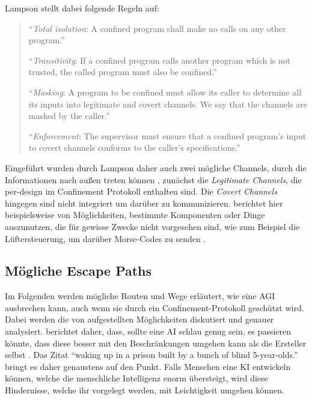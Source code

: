         Lampson stellt dabei folgende Regeln auf:
        \begin{quote}
            ``\textit{Total isolation}: A confined program shall make no calls on any other program.''

            ``\textit{Transitivity}: If a confined program calls another program which is not trusted, the
            called program must also be confined.''

            ``\textit{Masking}: A program to be confined must allow its caller to determine all its inputs into
            legitimate and covert channels. We say that the channels are masked by the caller.''

            ``\textit{Enforcement}: The supervisor must ensure that a confined program's input to covert
            channels conforms to the caller's specifications.''
        \end{quote}
        \cite{lampson1973note}
        Eingeführt wurden durch Lampson daher auch zwei mögliche Channels, durch die Informationen nach außen treten
        können \cite{yampolskiy2012leakproofing}, zunächst die \textit{Legitimate Channels}, die per-design im Confinement
        Protokoll enthalten sind. Die \textit{Covert Channels} hingegen sind nicht integriert um darüber zu kommunizieren.
        \citeauthor{yampolskiy2012leakproofing} berichtet hier beispielsweise von Möglichkeiten, bestimmte Komponenten oder
        Dinge auszunutzen, die für gewisse Zwecke nicht vorgesehen sind, wie zum Beispiel die Lüftersteuerung, um darüber
        Morse-Codes zu senden \cite[s. 204]{yampolskiy2012leakproofing}.

        \subsection{Mögliche Escape Paths}
        Im Folgenden werden mögliche Routen und Wege erläutert, wie eine AGI ausbrechen kann, auch wenn sie durch ein
        Confinement-Protokoll geschützt wird. Dabei werden die von \citeauthor{yampolskiy2012leakproofing} aufgestellten
        Möglichkeiten diskutiert und genauer analysiert. \citeauthor{hvistendahl_2019} berichtet daher, dass, sollte eine
        AI schlau genug sein, es passieren könnte, dass diese besser mit den Beschränkungen umgehen kann als die Ersteller
        selbst \citeyearpar{hvistendahl_2019}. Das Zitat ``waking up in a prison built by a bunch of blind 5-year-olds.''
        bringt es daher genaustens auf den Punkt. Falls Menschen eine KI entwickeln können, welche die menschliche
        Intelligenz enorm übersteigt, wird diese Hindernisse, welche ihr vorgelegt werden, mit Leichtigkeit umgehen können.


